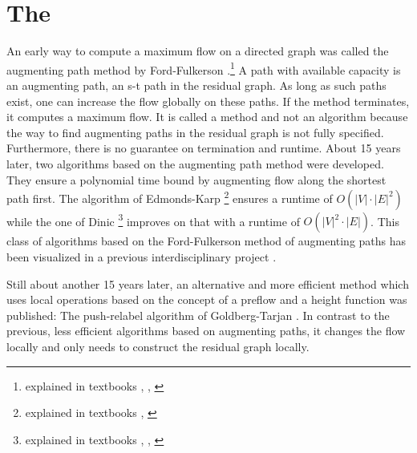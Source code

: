 \clearpage
\section{The \pushRelabel{}}
An early way to compute a maximum flow on a directed graph was called the augmenting path method by Ford-Fulkerson \cite{ford1956maximal}.\footnote{explained in textbooks \cite[sec. 6.4]{ahuja1993network}, \cite[sec. 26.2, p.724]{cormen2009introduction}, \cite[sec. 6.1]{jungnickel2013graphs}} A path with available capacity is an augmenting path, an s-t path in the residual graph. As long as such paths exist, one can increase the flow globally on these paths. If the method terminates, it computes a maximum flow. It is called a method and not an algorithm because the way to find augmenting paths in the residual graph is not fully specified. Furthermore, there is no guarantee on termination and runtime. About 15 years later, two algorithms based on the augmenting path method were developed. They ensure a polynomial time bound by augmenting flow along the shortest path first. The algorithm of Edmonds-Karp \cite{edmonds1972theoretical}\footnote{explained in textbooks \cite[sec. 26.2, p. 727]{cormen2009introduction}, \cite[sec. 6.2]{jungnickel2013graphs}} ensures a runtime of $O(|V|\cdot|E|^2)$ while the one of Dinic \cite{dinic1970algorithm}\footnote{explained in textbooks \cite[sec. 7.4]{ahuja1993network}, \cite[sec. 26.2]{cormen2009introduction}, \cite[sec. 6.4]{jungnickel2013graphs}} improves on that with a runtime of $O(|V|^2\cdot|E|)$. This class of algorithms based on the Ford-Fulkerson method of augmenting paths has been visualized in a previous interdisciplinary project \cite{fischer2016idp}.

Still about another 15 years later, an alternative and more efficient method which uses local operations based on the concept of a preflow and a height function was published: The push-relabel algorithm of Goldberg-Tarjan \cite{goldberg1988new}. In contrast to the previous, less efficient algorithms based on augmenting paths, it changes the flow locally and only needs to construct the residual graph locally. 

